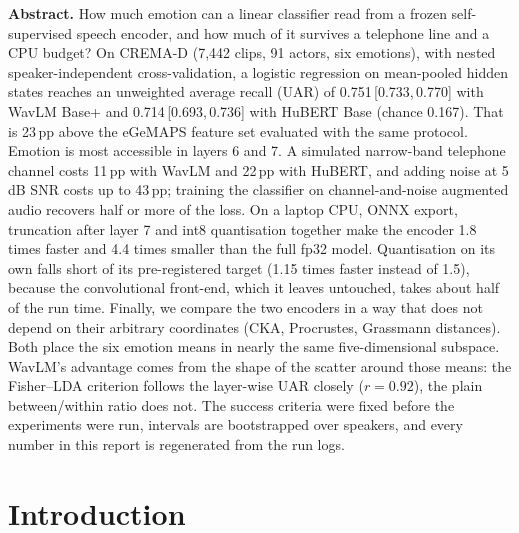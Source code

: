 \documentclass[11pt,a4paper]{article}
\newcommand{\pp}{\,pp}
\newcommand{\ci}[3]{#1\,{\color{muted}\footnotesize[#2,\,#3]}}
\begin{document}
\vspace{1.4cm}
\noindent\textbf{Abstract.}\enspace
How much emotion can a linear classifier read from a frozen self-supervised speech encoder,
and how much of it survives a telephone line and a CPU budget? On CREMA-D (7{,}442 clips,
91 actors, six emotions), with nested speaker-independent cross-validation, a logistic
regression on mean-pooled hidden states reaches an unweighted average recall (UAR) of
\ci{0.751}{0.733}{0.770} with WavLM Base+ and \ci{0.714}{0.693}{0.736} with HuBERT Base
(chance 0.167). That is 23\pp{} above the eGeMAPS feature set evaluated with the same protocol.
Emotion is most accessible in layers 6 and 7. A simulated narrow-band telephone channel costs
11\pp{} with WavLM and 22\pp{} with HuBERT, and adding noise at 5\,dB SNR costs up to 43\pp;
training the classifier on channel-and-noise augmented audio recovers half or more of the loss. On a
laptop CPU, ONNX export, truncation after layer 7 and int8 quantisation together make the
encoder 1.8 times faster and 4.4 times smaller than the full fp32 model. Quantisation on its own falls short of its
pre-registered target (1.15 times faster instead of 1.5), because the convolutional front-end,
which it leaves untouched, takes about half of the run time. Finally, we compare the two encoders
in a way that does not depend on their arbitrary coordinates (CKA, Procrustes, Grassmann
distances). Both place the six emotion means in nearly the same five-dimensional subspace.
WavLM's advantage comes from the shape of the scatter around those means: the Fisher--LDA
criterion follows the layer-wise UAR closely ($r=0.92$), the plain between/within ratio does
not. The success criteria were fixed before the experiments were run, intervals are
bootstrapped over speakers, and every number in this report is regenerated from the run logs.

\vspace{8pt}

\clearpage

\section{Introduction}
\end{document}
